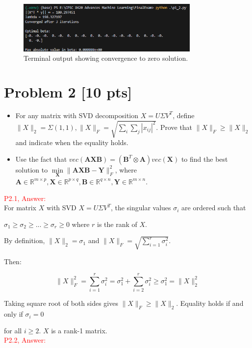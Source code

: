 \documentclass[11pt]{article}
\newcommand{\R}{\mathbb{R}}
\newcommand{\mtx}[1]{\mathbf{#1}}
\def \mA {\mtx{A}}
\def \mB {\mtx{B}}
\def \mX {\mtx{X}}
\def \mY {\mtx{Y}}
\def \R {\mathbb{R}}
\def \mB {\mtx{B}}
\def \mA {\mtx{A}}
\def \mX {\mtx{X}}
\def \mY {\mtx{Y}}
\begin{document}
\begin{figure}[h]
\centering
\includegraphics[width=0.8\textwidth]{p1_2_output.png}
\caption{Terminal output showing convergence to zero solution.}
\label{fig:p1_2_output}
\end{figure}



\newpage
\section*{Problem 2 [10 pts]}
\begin{itemize}
	\item For any matrix with SVD decomposition $X=U\Sigma V^T$, define $\|X\|_2=\Sigma(1,1), \|X\|_F=\sqrt{\sum_i\sum_j |x_{ij}|^2}$. Prove that $\|X\|_F\ge \|X\|_2$ and indicate when the equality holds.
	\item Use the fact that $vec(\mA\mX\mB)=(\mB^T\otimes\mA)vec(\mX)$ to find the best solution to $\min\limits_{\mX} \|\mA\mX\mB-\mY\|_F^2$, where $\mA\in\R^{m\times p}, \mX\in\R^{p\times q}, \mB\in\R^{q\times n}, \mY\in\R^{m\times n}$.
\end{itemize}


\textcolor{red}{P2.1, Answer:}\\

For matrix $X$ with SVD $X=U\Sigma V^T$, the singular values $\sigma_i$ are ordered such that 

$\sigma_1 \geq \sigma_2 \geq ... \geq \sigma_r \geq 0$ where $r$ is the rank of $X$. 

By definition, $\|X\|_2 = \sigma_1$ and $\|X\|_F = \sqrt{\sum_{i=1}^r \sigma_i^2}$. 

Then:

\[
\|X\|_F^2 = \sum_{i=1}^r \sigma_i^2 = \sigma_1^2 + \sum_{i=2}^r \sigma_i^2 \geq \sigma_1^2 = \|X\|_2^2
\]

Taking square root of both sides gives $\|X\|_F \geq \|X\|_2$. Equality holds if and only if $\sigma_i = 0$ 

for all $i \geq 2$. $X$ is a rank-1 matrix.\\

\textcolor{red}{P2.2, Answer:}\\
\end{document}
